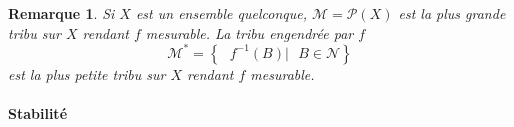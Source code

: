 \documentclass[3pt]{article}
\newtheorem{remark}[theorem]{Remarque}
\begin{document}
\bigskip 

\begin{remark}
Si $X$ est un ensemble quelconque, $\mathcal{M=P}(X)$ est la plus grande
tribu sur $X$ rendant $f$ mesurable. La tribu engendr\'{e}e par $f\ $%
\begin{equation*}
\mathcal{M}^{\ast }\mathcal{=}\left\{ \text{ }f^{-1}(B)|\text{ }B\in 
\mathcal{N}\right\} 
\end{equation*}%
est la plus petite tribu sur $X$ rendant $f$ mesurable. 
\end{remark}

\paragraph{Stabilit\'{e}}

\bigskip 
\end{document}
